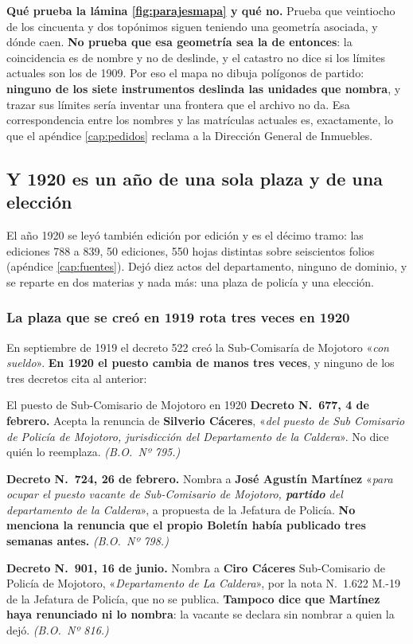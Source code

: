 \begin{cautela}
\textbf{Qué prueba la lámina \ref{fig:parajesmapa} y qué no.} Prueba que veintiocho de los
cincuenta y dos topónimos siguen teniendo una geometría asociada, y dónde caen. \textbf{No prueba
que esa geometría sea la de entonces}: la coincidencia es de nombre y no de deslinde, y el
catastro no dice si los límites actuales son los de 1909. Por eso el mapa no dibuja polígonos de
partido: \textbf{ninguno de los siete instrumentos deslinda las unidades que nombra}, y trazar sus
límites sería inventar una frontera que el archivo no da. Esa correspondencia entre los nombres y
las matrículas actuales es, exactamente, lo que el apéndice \ref{cap:pedidos} reclama a la
Dirección General de Inmuebles.
\end{cautela}

\subsection*{Y 1920 es un año de una sola plaza y de una elección}

El año 1920 se leyó también edición por edición y es el décimo tramo: las ediciones 788 a 839,
50 ediciones, 550 hojas distintas sobre seiscientos folios (apéndice \ref{cap:fuentes}). Dejó
diez actos del departamento, ninguno de dominio, y se reparte en dos materias y nada más: una
plaza de policía y una elección.

\subsubsection*{La plaza que se creó en 1919 rota tres veces en 1920}

En septiembre de 1919 el decreto 522 creó la Sub-Comisaría de Mojotoro «\textit{con sueldo}».
\textbf{En 1920 el puesto cambia de manos tres veces}, y ninguno de los tres decretos cita al
anterior:

\begin{ficha}{El puesto de Sub-Comisario de Mojotoro en 1920}
\textbf{Decreto N.\ 677, 4 de febrero.} Acepta la renuncia de \textbf{Silverio Cáceres},
«\textit{del puesto de Sub Comisario de Policía de Mojotoro, jurisdicción del Departamento de la
Caldera}». No dice quién lo reemplaza. \textit{(B.O.\ Nº 795.)}

\textbf{Decreto N.\ 724, 26 de febrero.} Nombra a \textbf{José Agustín Martínez} «\textit{para
ocupar el puesto vacante de Sub-Comisario de Mojotoro, \textbf{partido} del departamento de la
Caldera}», a propuesta de la Jefatura de Policía. \textbf{No menciona la renuncia que el propio
Boletín había publicado tres semanas antes.} \textit{(B.O.\ Nº 798.)}

\textbf{Decreto N.\ 901, 16 de junio.} Nombra a \textbf{Ciro Cáceres} Sub-Comisario de Policía de
Mojotoro, «\textit{Departamento de La Caldera}», por la nota N.\ 1.622 M.-19 de la Jefatura de
Policía, que no se publica. \textbf{Tampoco dice que Martínez haya renunciado ni lo nombra}: la
vacante se declara sin nombrar a quien la dejó. \textit{(B.O.\ Nº 816.)}
\end{ficha}

